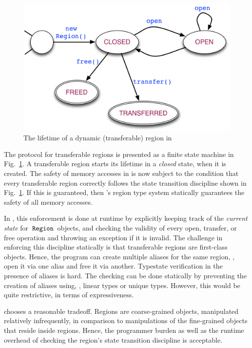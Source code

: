 \begin{figure}
\includegraphics[scale=0.45]{region-fsm.png}
\caption{The lifetime of a dynamic (transferable) region in \name}
\label{fig:region-fsm}
\end{figure}

The protocol for transferable regions is presented as a finite state machine in Fig.~\ref{fig:region-fsm}.
A transferable region starts its lifetime in a \emph{closed} state, when it is created.
%
The safety of memory accesses in \name is now subject to the condition that
every transferable region correctly follows the state transition discipline shown
in Fig.~\ref{fig:region-fsm}. If this is guaranteed, then \name's region type system
statically guarantees the safety of all memory accesses.

In \name, this enforcement is done at runtime by explicitly keeping
track of the \emph{current state} for $\,{\tt Region}\,$ objects, and
checking the validity of every open, transfer, or free operation
and throwing an exception if it is invalid.
The challenge in enforcing this discipline statically is that transferable regions
are first-class objects. Hence, the program can create multiple aliases for
the same region, \eg, open it via one alias and free it via another.
Typestate verification in the presence of aliases is hard.
The checking can be done statically by preventing the creation of aliases using, \eg, linear types
or unique types. However, this would be quite restrictive, in terms of expressiveness.

\name chooses a reasonable tradeoff. Regions are coarse-grained objects, manipulated relatively infrequently,
in comparison to manipulations of the fine-grained objects that reside inside regions. Hence, the programmer burden
as well as the runtime overhead of checking the region's state transition discipline is acceptable.

